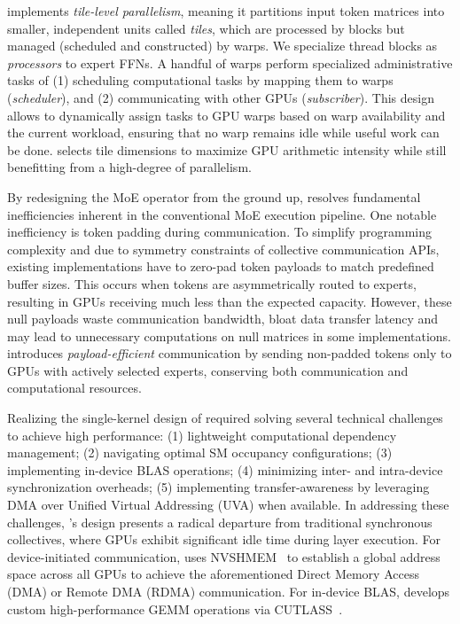 \sysname implements \emph{tile-level parallelism},
meaning it partitions input token matrices into smaller, independent units called \emph{tiles},
which are processed by blocks but managed (scheduled and constructed) by warps.
We specialize thread blocks as \emph{processors} to expert FFNs.
A handful of warps perform specialized administrative tasks of
(1) scheduling computational tasks by mapping them to warps (\emph{scheduler}),
and (2) communicating with other GPUs (\emph{subscriber}).
This design allows \sysname to dynamically assign tasks to GPU warps based on warp availability and the current workload,
ensuring that no warp remains idle while useful work can be done.
\sysname selects tile dimensions to maximize GPU arithmetic intensity
while still benefitting from a high-degree of parallelism.

By redesigning the MoE operator from the ground up,
\sysname resolves fundamental inefficiencies inherent in the conventional MoE execution pipeline.
One notable inefficiency is token padding during communication.
To simplify programming complexity and due to symmetry constraints of collective communication APIs,
existing implementations have to zero-pad token payloads to match predefined buffer sizes.
This occurs when tokens are asymmetrically routed to experts, resulting in GPUs receiving much less than the expected
capacity.
However, these null payloads waste communication bandwidth, bloat data transfer latency and may lead to
unnecessary computations on null matrices in some implementations.
\sysname introduces \emph{payload-efficient} communication by sending non-padded tokens only to
GPUs with actively selected experts, conserving both communication and computational resources.

Realizing the single-kernel design of \sysname required
solving several technical challenges to achieve high performance:
(1) lightweight computational dependency management; (2)
navigating optimal SM occupancy configurations; (3) implementing in-device BLAS operations;
(4) minimizing inter- and intra-device synchronization overheads; (5) implementing transfer-awareness by leveraging
DMA over Unified Virtual Addressing (UVA) when available.
In addressing these challenges, \sysname's design presents a
radical departure from traditional synchronous \alltoall collectives,
where GPUs exhibit significant idle time during layer execution.
For device-initiated communication,
\sysname uses NVSHMEM~\cite{nvshm} to establish a global address space across all GPUs to
achieve the aforementioned Direct Memory Access (DMA) or Remote DMA (RDMA) communication.
For in-device BLAS, \sysname develops custom high-performance GEMM operations via CUTLASS~\cite{Thakkar_CUTLASS_2023}.

